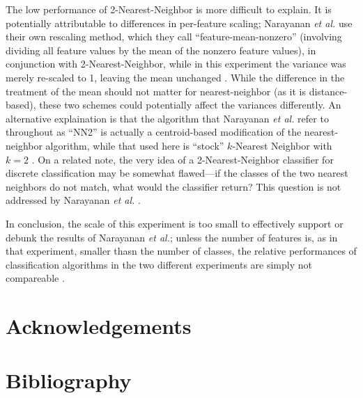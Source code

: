 \documentclass{article}
\begin{document}
The low performance of 2-Nearest-Neighbor is more difficult to explain. It is potentially attributable to differences in per-feature scaling; Narayanan \textit{et al.} use their own rescaling method, which they call ``feature-mean-nonzero'' (involving dividing all feature values by the mean of the nonzero feature values), in conjunction with 2-Nearest-Neighbor, while in this experiment the variance was merely re-scaled to 1, leaving the mean unchanged \cite{narayanan2012feasibility}. While the difference in the treatment of the mean should not matter for nearest-neighbor (as it is distance-based), these two schemes could potentially affect the variances differently. An alternative explaination is that the algorithm that Narayanan \textit{et al.} refer to throughout as ``NN2'' is actually a centroid-based modification of the nearest-neighbor algorithm, while that used here is ``stock'' $k$-Nearest Neighbor with $k=2$ \cite{narayanan2012feasibility}. On a related note, the very idea of a 2-Nearest-Neighbor classifier for discrete classification may be somewhat flawed---if the classes of the two nearest neighbors do not match, what would the classifier return? This question is not addressed by Narayanan \textit{et al.} \cite{narayanan2012feasibility}.

In conclusion, the scale of this experiment is too small to effectively support or debunk the results of Narayanan \textit{et al.}; unless the number of features is, as in that experiment, smaller thasn the number of classes, the relative performances of classification algorithms in the two different experiments are simply not compareable \cite{narayanan2012feasibility}.


\section{Acknowledgements}

\section{Bibliography}


\end{document}
